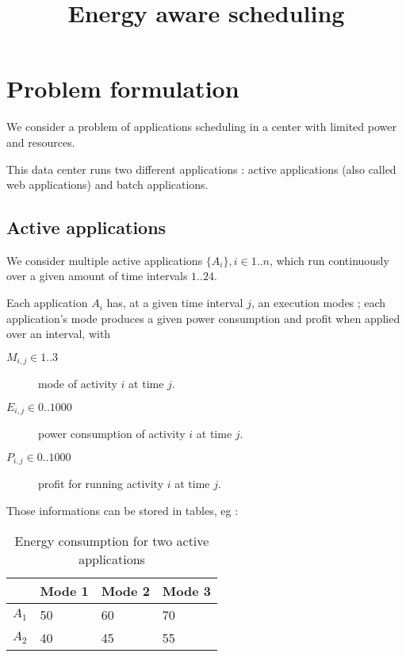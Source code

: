 \documentclass[a4paper]{article}
\begin{document}
\title{Energy aware scheduling}

\maketitle

\section{Problem formulation}

We consider a problem of applications scheduling in a center with limited power and resources.


This data center runs two different applications : active applications (also called web applications) and batch applications.


\subsection{Active applications}

We consider multiple active applications $\{A_{i}\}, i \in 1..n$, which run continuously over a given amount of time intervals $1..24$.

Each application $A_i$ has, at a given time interval $j$, an execution modes ; each application's mode produces a given power consumption and profit when applied over an interval, with
\begin{description}
 \item[$M_{i,j} \in 1..3$] mode of activity $i$ at time $j$.
 \item[$E_{i,j} \in 0..1000$] power consumption of activity $i$ at time $j$.
 \item[$P_{i,j} \in 0..1000$] profit for running activity $i$ at time $j$.
\end{description}

Those informations can be stored in tables, eg :

\begin{table}[H]
\begin{center}
  \begin{tabular}{ | l | l | l | l |}
     \hline
      & Mode 1 & Mode 2 & Mode 3 \\ \hline
    $A_1$ & 50 & 60 & 70 \\ \hline
    $A_2$ & 40 & 45 & 55 \\
    \hline
    \end{tabular}
\end{center}
\caption{Energy consumption for two active applications}
\end{table}
\end{document}
